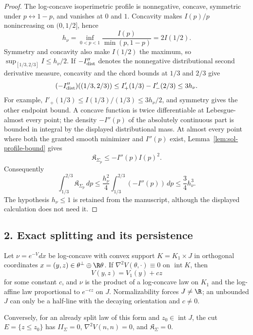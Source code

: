 \documentclass[../main.tex]{subfiles}
\begin{document}
\begin{proof}
The log-concave isoperimetric profile is nonnegative, concave, symmetric under
$p\leftrightarrow1-p$, and vanishes at $0$ and $1$.  Concavity makes $I(p)/p$ nonincreasing on
$(0,1/2]$, hence
\[
  h_\nu=\inf_{0<p<1}\frac{I(p)}{\min(p,1-p)}=2I(1/2).
\]
Symmetry and concavity also make $I(1/2)$ the maximum, so
$\sup_{[1/3,2/3]}I\le h_\nu/2$.  If $-I''_{\rm dist}$ denotes the nonnegative distributional
second derivative measure, concavity and the chord bounds at $1/3$ and $2/3$ give
\[
  (-I''_{\rm dist})((1/3,2/3))
  \le I'_+(1/3)-I'_-(2/3)
  \le 3h_\nu.
\]
For example, $I'_+(1/3)\le I(1/3)/(1/3)\le3h_\nu/2$, and symmetry gives the other endpoint
bound.  A concave function is twice differentiable at Lebesgue-almost every point; the density
$-I''(p)$ of the absolutely continuous part is bounded in integral by the displayed
distributional mass.  At almost every point where both the granted smooth minimizer and
$I''(p)$ exist, Lemma~\ref{lem:sol-profile-bound} gives
\[
  \mathfrak K_{\Sigma_p}\le-I''(p)I(p)^2.
\]
Consequently
\[
  \int_{1/3}^{2/3}\mathfrak K_{\Sigma_p}\,dp
  \le \frac{h_\nu^2}{4}\int_{1/3}^{2/3}(-I''(p))\,dp
  \le\frac34h_\nu^3.
\]
The hypothesis $h_\nu\le1$ is retained from the manuscript, although the displayed calculation
does not need it.
\end{proof}

\subsection*{2. Exact splitting and its persistence}

\begin{proposition}[= Proposition~\ref{prop:exact-splitting}]
\label{prop:sol-exact-splitting}
Let $\nu=e^{-V}dx$ be log-concave with convex support $K=K_1\times J$ in orthogonal coordinates
$x=(y,z)\in\theta^\perp\oplus\R\theta$.  If
$\nabla^2V(\theta,\cdot)\equiv0$ on $\operatorname{int}K$, then
\[
  V(y,z)=V_1(y)+cz
\]
for some constant $c$, and $\nu$ is the product of a log-concave law on $K_1$ and the
log-affine law proportional to $e^{-cz}$ on $J$.  Normalizability forces $J\ne\R$; an unbounded
$J$ can only be a half-line with the decaying orientation and $c\ne0$.

Conversely, for an already split law of this form and $z_0\in\operatorname{int}J$, the cut
$E=\{z\le z_0\}$ has $II_\Sigma=0$, $\nabla^2V(n,n)=0$, and
$\mathfrak K_\Sigma=0$.
\end{proposition}
\end{document}
